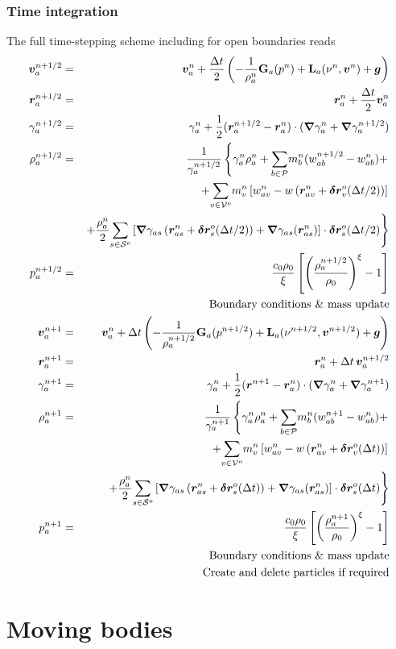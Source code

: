 \subsubsection{Time integration}
The full time-stepping scheme including for open boundaries reads
\begin{eqnarray}
\bm{v}_a^{n+1/2} &=& \bm{v}_a^n + \frac{\Delta t}{2} \left(
-\frac{1}{\rho^n_a}\textbf{G}_a(p^n) + \textbf{L}_a(\nu^n,\bm{v}^n) + \bm{g}
\right)
\label{e:open:pred-corr-ns}
\\
\bm{r}_a^{n+1/2} &=& \bm{r}_a^{n} + \frac{\Delta t}{2}
\bm{v}_a^{n}
\nonumber
\\
\gamma_a^{n+1/2} &=& \gamma_a^{n} + \frac{1}{2}
(\bm{r}_a^{n+1/2} - \bm{r}_a^{n}) \cdot (\bm{\nabla} \gamma_a^n + \bm{\nabla} \gamma_a^{n+1/2})
\nonumber
\\
\rho_a^{n+1/2} &=& \frac{1}{\gamma_a^{n+1/2}}\left\{ \gamma_a^n \rho_a^n +
\underset{b \in \mathcal{P}}{\sum} m_b^n (w_{ab}^{n+1/2} - w_{ab}^n) + \right.
\nonumber
\\
&&\left. + \underset{v\in\mathcal{V}^o}{\sum}m_v^n\left[ w_{av}^n -
w\left( \bm{r}_{av}^n + \bm{\delta r}_v^o(\Delta t/2) \right) \right]\right.
\nonumber
\\
&&\left. + \frac{\rho_a^n}{2}\underset{s\in\mathcal{S}^o}{\sum}\left[
\bm{\nabla}\gamma_{as}\left(\bm{r}_{as}^n + \bm{\delta r}_s^o(\Delta t/2)\right) +
\bm{\nabla}\gamma_{as}(\bm{r}_{as}^n)
\right]\cdot\bm{\delta r}_s^o(\Delta t/2)\right\}
\nonumber
\\
p_a^{n+1/2} &=& \frac{c_0 \rho_0}{\xi}\left[ \left( \frac{\rho_a^{n+1/2}}{\rho_0}\right)^\xi
-1 \right]
\nonumber
\\
&&\mbox{Boundary conditions \& mass update}
\nonumber
\\
\bm{v}_a^{n+1} &=& \bm{v}_a^n + \Delta t \left(
-\frac{1}{\rho^{n+1/2}_a}\textbf{G}_a(p^{n+1/2}) +
\textbf{L}_a(\nu^{n+1/2},\bm{v}^{n+1/2}) + \bm{g}
\right)
\nonumber
\\
\bm{r}_a^{n+1} &=& \bm{r}_a^{n} + \Delta t\,
\bm{v}_a^{n+1/2}
\nonumber
\\
\gamma_a^{n+1} &=& \gamma_a^{n} +\frac{1}{2}
(\bm{r}^{n+1} - \bm{r}_a^{n}) \cdot (\bm{\nabla} \gamma_a^n + \bm{\nabla} \gamma_a^{n+1})
\nonumber
\\
\rho_a^{n+1} &=& \frac{1}{\gamma_a^{n+1}}\left\{ \gamma_a^n \rho_a^n +
\underset{b \in \mathcal{P}}{\sum} m_b^n (w_{ab}^{n+1} - w_{ab}^n) + \right.
\nonumber
\\
&&\left. + \underset{v\in\mathcal{V}^o}{\sum}m_v^n\left[ w_{av}^n -
w\left( \bm{r}_{av}^n + \bm{\delta r}_v^o(\Delta t) \right) \right]\right.
\nonumber
\\
&&\left. + \frac{\rho_a^n}{2}\underset{s\in\mathcal{S}^o}{\sum}\left[
\bm{\nabla}\gamma_{as}\left(\bm{r}_{as}^n + \bm{\delta r}_s^o(\Delta t)\right) +
\bm{\nabla}\gamma_{as}(\bm{r}_{as}^n)
\right]\cdot\bm{\delta r}_s^o(\Delta t)\right\}
\nonumber
\\
p_a^{n+1} &=& \frac{c_0 \rho_0}{\xi}\left[ \left( \frac{\rho_a^{n+1}}{\rho_0}\right)^\xi
-1 \right]
\nonumber
\\
&&\mbox{Boundary conditions \& mass update}
\nonumber
\\
&&\mbox{Create and delete particles if required}
\nonumber
\end{eqnarray}




\section{Moving bodies}
